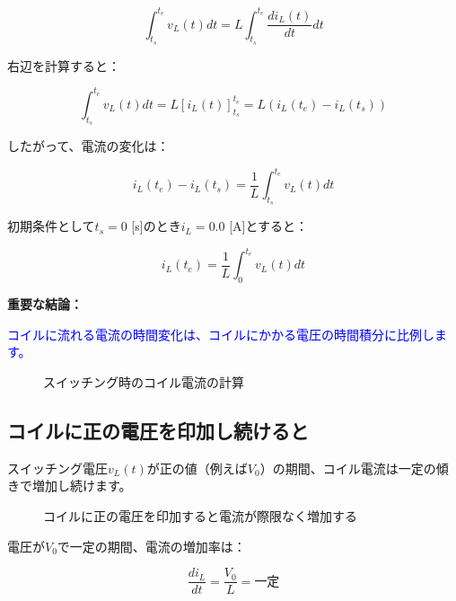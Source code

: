 \begin{equation}
\int_{t_s}^{t_e} v_L(t)dt = L \int_{t_s}^{t_e} \frac{di_L(t)}{dt} dt
\end{equation}

右辺を計算すると：

\begin{equation}
\int_{t_s}^{t_e} v_L(t)dt = L \left[ i_L(t) \right]_{t_s}^{t_e} = L(i_L(t_e) - i_L(t_s))
\end{equation}

したがって、電流の変化は：

\begin{equation}
i_L(t_e) - i_L(t_s) = \frac{1}{L} \int_{t_s}^{t_e} v_L(t)dt
\end{equation}

初期条件として$t_s = 0$ [s]のとき$i_L = 0.0$ [A]とすると：

\begin{equation}
i_L(t_e) = \frac{1}{L} \int_0^{t_e} v_L(t)dt
\end{equation}

\textbf{重要な結論：}

\textcolor{blue}{コイルに流れる電流の時間変化は、コイルにかかる電圧の時間積分に比例します。}

\begin{figure}[H]
\centering
{}
\caption{スイッチング時のコイル電流の計算}
\label{fig:ch04_inductor_current}
\end{figure}

\subsection{コイルに正の電圧を印加し続けると}

スイッチング電圧$v_L(t)$が正の値（例えば$V_0$）の期間、コイル電流は一定の傾きで増加し続けます。

\begin{figure}[H]
\centering
{}
\caption{コイルに正の電圧を印加すると電流が際限なく増加する}
\label{fig:ch04_inductor_increasing}
\end{figure}

電圧が$V_0$で一定の期間、電流の増加率は：

\begin{equation}
\frac{di_L}{dt} = \frac{V_0}{L} = \text{一定}
\end{equation}

